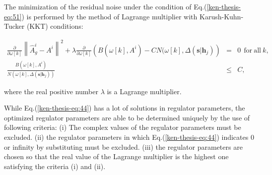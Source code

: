 \documentclass[%
 aps,
 prd,
 amsmath,amssymb,
 reprint,%
superscriptaddress
]{revtex4-1}
\begin{document}
The minimization of the residual noise under the condition of Eq.(\ref{ken-thesis-eq:51}) is performed by the method of Lagrange multiplier with Karush-Kuhn-Tucker (KKT) conditions\cite{Boyd:2004:CO:993483}:
\begin{widetext}
 \begin{eqnarray}\label{ken-thesis-eq:44}
 \frac{\partial}{\partial \omega[k]}\left\|\hat{A}_{g}^{i} - A^{i}\right\|^{2} + \lambda \frac{\partial}{\partial \omega[k]}\left(B(\omega[k], A^{i}) - CN(\omega[k], \Delta(\bm{s}|\bm{h}_{j})\right)&=&0\ \ \mathrm{for}\ \mathrm{all}\ k,\\
  \frac{B(\omega[k], A^{i})}{N(\omega[k], \Delta(\bm{s}|\bm{h}_{j}))} &\leq& C,\nonumber
\end{eqnarray}
\end{widetext}
where the real positive number
$\lambda$
is a Lagrange multiplier.

While Eq.(\ref{ken-thesis-eq:44}) has a lot of solutions in regulator parameters, the optimized regulator parameters are able to be determined uniquely by the use of following criteria: (i) The complex values of the regulator parameters must be excluded. (ii) the regulator parameters in which Eq.(\ref{ken-thesis-eq:44}) indicates 0 or infinity by substituting must be excluded. (iii) the regulator parameters are chosen so that the real value of the Lagrange multiplier is the highest one satisfying the criteria (i) and (ii).
\end{document}
